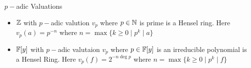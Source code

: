 \begin{example}{$p-$adic Valuations}{}
	\begin{itemize}
		\item $\mathbb{Z}$ with $p-$adic valution $v_p$ where $p\in\mathbb{N}$ is prime is a Hensel ring. Here $v_p(a)=p^{-n}$ where $n=\max\{k\geq 0\mid p^k\mid a\}$
		\item $\mathbb{F}[y]$ with $p-$adic valutaion $v_p$ where $p\in \mathbb{F}[y]$ is an irreducible polynomial is a Hensel Ring. Here $v_p(f)=2^{-n\deg p}$ where $n=\max\{k\geq 0\mid p^k\mid f\}$
	\end{itemize}
\end{example}

